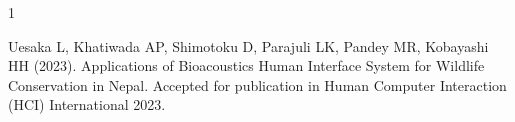 \begin{雑誌論文}{1}

Uesaka L, Khatiwada AP, Shimotoku D, Parajuli LK, Pandey MR, Kobayashi HH (2023). Applications of Bioacoustics Human Interface System for Wildlife Conservation in Nepal. Accepted for publication in Human Computer Interaction (HCI) International 2023.

\end{雑誌論文}
